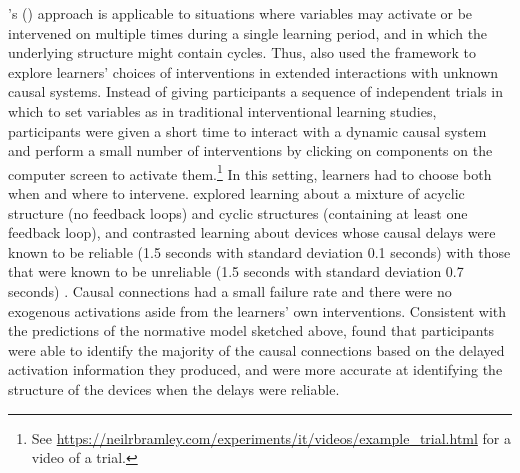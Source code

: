 \documentclass{cambridge7A}%
\def\citeapos#1{\citeauthor{#1}'s (\citeyear{#1})}
\begin{document}
\citeapos{bramley2018time} approach is applicable to situations where variables may activate or be intervened on multiple times during a single learning period, and in which the underlying structure might contain cycles.  Thus, \cite{bramley2017dynamic} also used the framework to explore learners' choices of interventions in extended interactions with unknown causal systems.  Instead of giving participants a sequence of independent trials in which to set variables as in traditional interventional learning studies, participants were given a short time to interact with a dynamic causal system and perform a small number of interventions by clicking on components on the computer screen to activate them.\footnote{See \url{https://neilrbramley.com/experiments/it/videos/example\_trial.html} for a video of a trial.}   In this setting, learners had to choose both when and where to intervene.  \cite{bramley2017dynamic} explored learning about a mixture of acyclic structure (no feedback loops) and cyclic structures (containing at least one feedback loop), and contrasted learning about devices whose causal delays were known to be reliable (1.5 seconds with standard deviation 0.1 seconds) with those that were known to be unreliable (1.5 seconds with standard deviation 0.7 seconds) .  Causal connections had a small failure rate and there were no exogenous activations aside from the learners' own interventions.  Consistent with the predictions of the normative model sketched above, \cite{bramley2017dynamic} found that participants were able to identify the majority of the causal connections based on the delayed activation information they produced, and were more accurate at identifying the structure of the devices when the delays were reliable.  %
\end{document}
